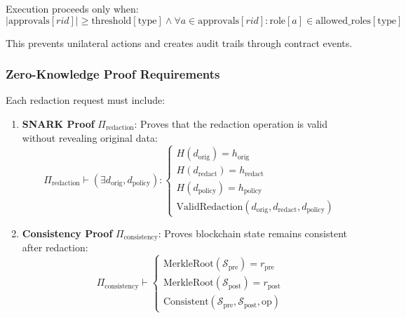 Execution proceeds only when:
\begin{equation}
    |\text{approvals}[rid]| \geq \text{threshold}[\text{type}] \wedge \forall a \in \text{approvals}[rid] : \text{role}[a] \in \text{allowed\_roles}[\text{type}]
\end{equation}

This prevents unilateral actions and creates audit trails through contract events.

\subsubsection{Zero-Knowledge Proof Requirements}

Each redaction request must include:

\begin{enumerate}
    \item \textbf{SNARK Proof} $\Pi_{\text{redaction}}$: Proves that the redaction operation is valid without revealing original data:
    \begin{equation}
        \Pi_{\text{redaction}} \vdash (\exists d_{\text{orig}}, d_{\text{policy}}) : 
        \begin{cases}
            H(d_{\text{orig}}) = h_{\text{orig}} \\
            H(d_{\text{redact}}) = h_{\text{redact}} \\
            H(d_{\text{policy}}) = h_{\text{policy}} \\
            \text{ValidRedaction}(d_{\text{orig}}, d_{\text{redact}}, d_{\text{policy}})
        \end{cases}
    \end{equation}
    
    \item \textbf{Consistency Proof} $\Pi_{\text{consistency}}$: Proves blockchain state remains consistent after redaction:
    \begin{equation}
        \Pi_{\text{consistency}} \vdash 
        \begin{cases}
            \text{MerkleRoot}(\mathcal{S}_{\text{pre}}) = r_{\text{pre}} \\
            \text{MerkleRoot}(\mathcal{S}_{\text{post}}) = r_{\text{post}} \\
            \text{Consistent}(\mathcal{S}_{\text{pre}}, \mathcal{S}_{\text{post}}, \text{op})
        \end{cases}
    \end{equation}
\end{enumerate}

